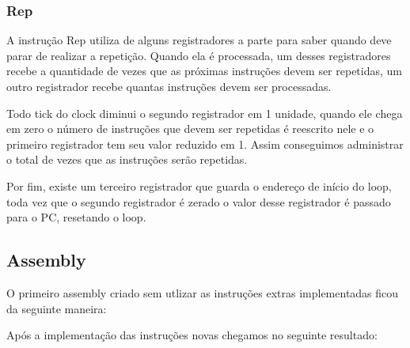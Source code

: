 \documentclass{article}
\begin{document}
    \subsubsection{Rep}

    A instrução Rep utiliza de alguns registradores a parte para saber quando deve parar de realizar a repetição. Quando ela é processada, um desses registradores recebe a quantidade de vezes que as próximas instruções devem ser repetidas, um outro registrador recebe quantas instruções devem ser processadas.

    Todo tick do clock diminui o segundo registrador em 1 unidade, quando ele chega em zero o número de instruções que devem ser repetidas é reescrito nele e o primeiro registrador tem seu valor reduzido em 1.
    Assim conseguimos administrar o total de vezes que as instruções serão repetidas.
    
    Por fim, existe um terceiro registrador que guarda o endereço de início do loop, toda vez que o segundo registrador é zerado o valor desse registrador é passado para o PC, resetando o loop.

    \subsection{Assembly}

    O primeiro assembly criado sem utlizar as instruções extras implementadas ficou da seguinte maneira:


    Após a implementação das instruções novas chegamos no seguinte resultado:
\end{document}
